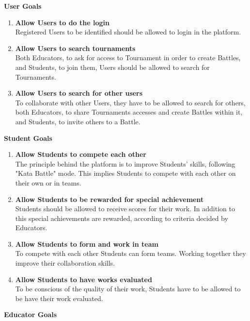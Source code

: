 \documentclass{article}
\begin{document}
\textbf{User Goals}
    \begin{enumerate}[label=$\bullet$ \textbf{GU\arabic*:}]
        \item \textbf{Allow Users to do the login}\\Registered Users to be identified should be allowed to login in the platform.
        \item \textbf{Allow Users to search tournaments}\\Both Educators, to ask for access to Tournament in order to create Battles, and Students, to join them, Users should be allowed to search for Tournaments.
        \item \textbf{Allow Users to search for other users}\\To collaborate with other Users, they have to be allowed to search for others, both Educators, to share Tournaments accesses and create Battles within it, and Students, to invite others to a Battle.
    \end{enumerate}
\textbf{Student Goals}
\begin{enumerate}[label=$\bullet$ \textbf{GS\arabic*:}]
    \item \textbf{Allow Students to compete each other}\\The principle behind the platform is to improve Students' skills, following "Kata Battle" mode. This implies Students to compete with each other on their own or in teams.
    \item \textbf{Allow Students to be rewarded for special achievement}\\Students should be allowed to receive scores for their work. In addition to this special achievements are rewarded, according to criteria decided by Educators.
    \item \textbf{Allow Students to form and work in team}\\To compete with each other Students can form teams. Working together they improve their collaboration skills.
    \item \textbf{Allow Students to have works evaluated}\\To be conscious of the quality of their work, Students have to be allowed to be have their work evaluated.
\end{enumerate}
\textbf{Educator Goals}
\end{document}

